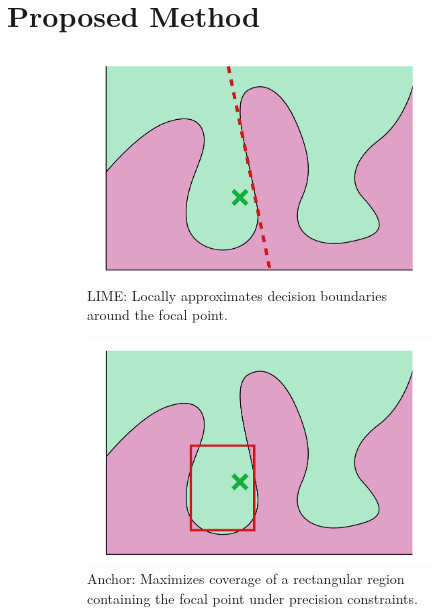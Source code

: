 \documentclass[runningheads]{llncs}
\begin{document}
\section{Proposed Method}
\begin{figure}[tb]
  \centering
  \begin{subfigure}[t]{0.45\textwidth}
    \centering
    \includegraphics[width=\textwidth]{lime}
    \caption{%
      LIME: Locally approximates decision boundaries around the focal point.}\label{fig:lime}
  \end{subfigure}%
  \hfill
  \begin{subfigure}[t]{0.45\textwidth}
    \centering
    \includegraphics[width=\textwidth]{anchor}
    \caption{Anchor: Maximizes coverage of a rectangular region containing the focal point under precision constraints.}\label{fig:anchor}
  \end{subfigure}
  \hfill
  \begin{subfigure}[t]{0.45\textwidth}

\end{subfigure}
\end{figure}
\end{document}
